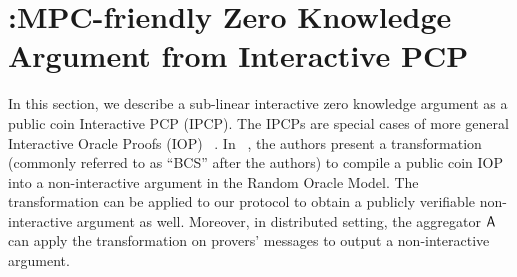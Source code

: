 \section{\name:MPC-friendly Zero Knowledge Argument from Interactive
PCP}\label{sec:graphene}
In this section, we describe a sub-linear interactive zero knowledge argument as
a public coin Interactive PCP (IPCP). The IPCPs are special cases of more
general Interactive Oracle Proofs (IOP) ~\cite{BCS16}. In ~\cite{BCS16}, the
authors present a transformation (commonly referred to as ``BCS'' after the
authors) to compile a public coin IOP into a non-interactive argument in the
Random Oracle Model. The transformation can be applied to our protocol to obtain
a publicly verifiable non-interactive argument as well. Moreover, in distributed
setting, the aggregator $\mathsf{A}$ can apply the transformation on provers' messages
to output a non-interactive argument. 

